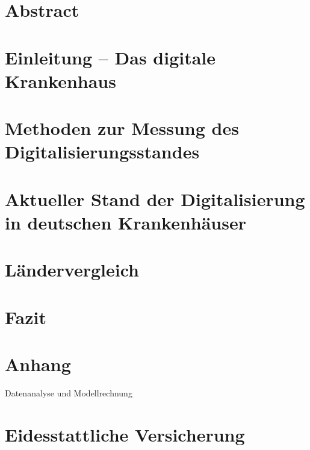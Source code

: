 
\section*{Abstract}

\newpage
{}
\tableofcontents
\newpage
{}
\listoftables
{}
\newpage
{}
\listoffigures
{}
\newpage
{}
% 
\section{Einleitung -- Das digitale Krankenhaus}

\section{Methoden zur Messung des Digitalisierungsstandes}

\section{Aktueller Stand der Digitalisierung in deutschen Krankenhäuser} \label{sec:stand in deutschland}

\section{Ländervergleich} \label{sec:laendervergleich}

\section{Fazit}

\newpage
{}
\printbibliography
{}
\newpage
{}
\section*{Anhang}
\label{sec:Anhang}
Datenanalyse und Modellrechnung
\newpage


\section*{Eidesstattliche Versicherung}

